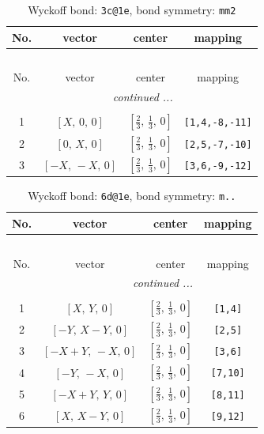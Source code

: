 \documentclass[fleqn,8pt]{jsarticle}
\begin{document}
\begin{longtable}{cccc}
\caption{Wyckoff bond: {\tt 3c@1e}, bond symmetry: {\tt mm2}}
 \\
 \hline \hline
No. & vector & center & mapping \\ \hline \endfirsthead

\multicolumn{3}{l}{\tablename\ \thetable{}} \\
 \hline \hline
No. & vector & center & mapping \\ \hline \endhead

 \hline \hline
\multicolumn{3}{r}{\footnotesize\it continued ...} \\ \endfoot

 \hline \hline
\multicolumn{3}{r}{} \\ \endlastfoot

1 & $\left[ X,\, 0,\, 0 \right]$ & $\left[ \frac{2}{3},\, \frac{1}{3},\, 0 \right]$ & {\tt [1,4,-8,-11]} \\ \hline
2 & $\left[ 0,\, X,\, 0 \right]$ & $\left[ \frac{2}{3},\, \frac{1}{3},\, 0 \right]$ & {\tt [2,5,-7,-10]} \\ \hline
3 & $\left[ - X,\, - X,\, 0 \right]$ & $\left[ \frac{2}{3},\, \frac{1}{3},\, 0 \right]$ & {\tt [3,6,-9,-12]} \\
\end{longtable}
\renewcommand{\arraystretch}{1.2}
\begin{longtable}{cccc}
\caption{Wyckoff bond: {\tt 6d@1e}, bond symmetry: {\tt m..}}
 \\
 \hline \hline
No. & vector & center & mapping \\ \hline \endfirsthead

\multicolumn{3}{l}{\tablename\ \thetable{}} \\
 \hline \hline
No. & vector & center & mapping \\ \hline \endhead

 \hline \hline
\multicolumn{3}{r}{\footnotesize\it continued ...} \\ \endfoot

 \hline \hline
\multicolumn{3}{r}{} \\ \endlastfoot

1 & $\left[ X,\, Y,\, 0 \right]$ & $\left[ \frac{2}{3},\, \frac{1}{3},\, 0 \right]$ & {\tt [1,4]} \\ \hline
2 & $\left[ - Y,\, X - Y,\, 0 \right]$ & $\left[ \frac{2}{3},\, \frac{1}{3},\, 0 \right]$ & {\tt [2,5]} \\ \hline
3 & $\left[ - X + Y,\, - X,\, 0 \right]$ & $\left[ \frac{2}{3},\, \frac{1}{3},\, 0 \right]$ & {\tt [3,6]} \\ \hline
4 & $\left[ - Y,\, - X,\, 0 \right]$ & $\left[ \frac{2}{3},\, \frac{1}{3},\, 0 \right]$ & {\tt [7,10]} \\ \hline
5 & $\left[ - X + Y,\, Y,\, 0 \right]$ & $\left[ \frac{2}{3},\, \frac{1}{3},\, 0 \right]$ & {\tt [8,11]} \\ \hline
6 & $\left[ X,\, X - Y,\, 0 \right]$ & $\left[ \frac{2}{3},\, \frac{1}{3},\, 0 \right]$ & {\tt [9,12]} \\
\end{longtable}
\end{document}
